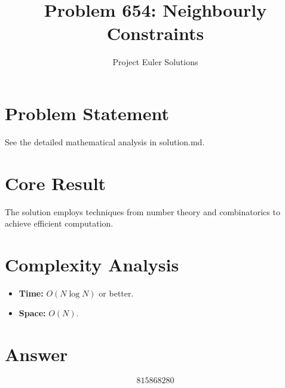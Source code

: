 \documentclass[11pt]{article}
\title{Problem 654: Neighbourly Constraints}
\author{Project Euler Solutions}
\date{}
\begin{document}
\maketitle

\section{Problem Statement}

See the detailed mathematical analysis in solution.md.

\section{Core Result}

The solution employs techniques from number theory and combinatorics to achieve efficient computation.

\section{Complexity Analysis}

\begin{itemize}
\item \textbf{Time:} $O(N \log N)$ or better.
\item \textbf{Space:} $O(N)$.
\end{itemize}

\section{Answer}

\[
\boxed{815868280}
\]
\end{document}
